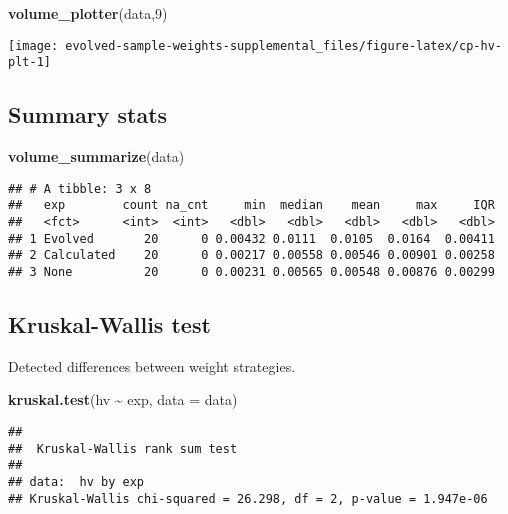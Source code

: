 \documentclass[
]{book}
\newenvironment{Shaded}{\begin{snugshade}}{\end{snugshade}}
\newcommand{\AttributeTok}[1]{\textcolor[rgb]{0.13,0.29,0.53}{#1}}
\newcommand{\DecValTok}[1]{\textcolor[rgb]{0.00,0.00,0.81}{#1}}
\newcommand{\FunctionTok}[1]{\textcolor[rgb]{0.13,0.29,0.53}{\textbf{#1}}}
\newcommand{\NormalTok}[1]{#1}
\newcommand{\SpecialCharTok}[1]{\textcolor[rgb]{0.81,0.36,0.00}{\textbf{#1}}}
\begin{document}
\begin{Shaded}
\begin{Highlighting}[]
\FunctionTok{volume\_plotter}\NormalTok{(data,}\DecValTok{9}\NormalTok{)}
\end{Highlighting}
\end{Shaded}

\texttt{[image: evolved-sample-weights-supplemental\_files/figure-latex/cp-hv-plt-1]}

\hypertarget{summary-stats-8}{%
\subsection{Summary stats}\label{summary-stats-8}}

\begin{Shaded}
\begin{Highlighting}[]
\FunctionTok{volume\_summarize}\NormalTok{(data)}
\end{Highlighting}
\end{Shaded}

\begin{verbatim}
## # A tibble: 3 x 8
##   exp        count na_cnt     min  median    mean     max     IQR
##   <fct>      <int>  <int>   <dbl>   <dbl>   <dbl>   <dbl>   <dbl>
## 1 Evolved       20      0 0.00432 0.0111  0.0105  0.0164  0.00411
## 2 Calculated    20      0 0.00217 0.00558 0.00546 0.00901 0.00258
## 3 None          20      0 0.00231 0.00565 0.00548 0.00876 0.00299
\end{verbatim}

\hypertarget{kruskal-wallis-test-8}{%
\subsection{Kruskal-Wallis test}\label{kruskal-wallis-test-8}}

Detected differences between weight strategies.

\begin{Shaded}
\begin{Highlighting}[]
\FunctionTok{kruskal.test}\NormalTok{(hv }\SpecialCharTok{\textasciitilde{}}\NormalTok{ exp, }\AttributeTok{data =}\NormalTok{ data)}
\end{Highlighting}
\end{Shaded}

\begin{verbatim}
## 
##  Kruskal-Wallis rank sum test
## 
## data:  hv by exp
## Kruskal-Wallis chi-squared = 26.298, df = 2, p-value = 1.947e-06
\end{verbatim}
\end{document}
